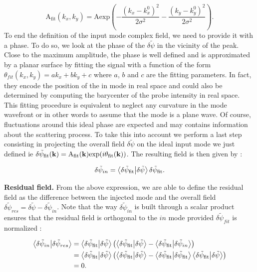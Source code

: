 \begin{equation}
    \mathrm{A_{fit}}(k_x,k_y) = \mathrm{A} \mathrm{exp}(-\frac{(k_x-k_x^0)^2}{2\sigma^2}-\frac{(k_y-k_y^0)^2}{2\sigma^2}).
    \label{eq:gaussian_amp} 
\end{equation}
To end the definition of the input mode complex field, we need to provide it with a phase. To do so, we look at the phase of the $\delta \tilde{\psi}$ 
in the vicinity of the peak. Close to the maximum amplitude, the phase is well defined and is approximated by a planar surface by 
fitting the signal with a function of the form $\theta_{fit}(k_x, k_y)=ak_x+bk_y+c$ where $a$, $b$ and $c$ are the fitting parameters.
In fact, they encode the position of the in mode in real space and could also be determined by computing the barycenter
of the probe intensity in real space. This fitting procedure is equivalent to neglect any curvature 
in the mode wavefront or in other words to assume that the mode is a plane wave. Of course, fluctuations 
around this ideal phase are expected and may contains information about the scattering process. To take this into account we perform a last step 
consisting in projecting the overall field $\delta \tilde{\psi}$ on the ideal input mode we just defined ie $\delta \tilde{\psi}_{\mathrm{fit}}(\mathbf{k})= \mathrm{A_{fit}}(\mathbf{k})\mathrm{exp}(i\theta_{\mathrm{fit}}(\mathbf{k}))$.
The resulting field is then given by : 

\begin{equation}
    \delta \tilde{\psi}_{in} = \bra{\delta \tilde{\psi}_{\mathrm{fit}}}\ket{\delta \tilde{\psi}} \delta \tilde{\psi}_{\mathrm{fit}}. 
    \label{eq:input_mode_scalar_product}
\end{equation}

\bigskip 

\textbf{Residual field.} From the above expression, we are able to define the residual field as the difference between the injected mode and the overall field $\delta \tilde{\psi}_{res} = \delta \tilde{\psi}-\delta \tilde{\psi}_{in}$. 
Note that the way $\delta \tilde{\psi}_{in}$ is built through a scalar product ensures that the residual field is orthogonal to the $in$ mode provided $\delta \tilde{\psi}_{fit}$ is normalized :

\begin{equation}
    \begin{aligned}
    \bra{\delta \tilde{\psi}_{in}}\ket{\delta \tilde{\psi}_{res}} &=\bra{\delta \tilde{\psi}_{\mathrm{fit}}}\ket{\delta \tilde{\psi}} \left(\bra{\delta \tilde{\psi}_{\mathrm{fit}}}\ket{\delta \tilde{\psi}} - \bra{\delta \tilde{\psi}_{\mathrm{fit}}}\ket{\delta \tilde{\psi}_{in}}\right)\\
    &= \bra{\delta \tilde{\psi}_{\mathrm{fit}}}\ket{\delta \tilde{\psi}} \left(\bra{\delta \tilde{\psi}_{\mathrm{fit}}}\ket{\delta \tilde{\psi}}-\bra{\delta \tilde{\psi}_{\mathrm{fit}}}\ket{\delta \tilde{\psi}_{\mathrm{fit}}}\bra{\delta \tilde{\psi}_{\mathrm{fit}}}\ket{\delta \tilde{\psi}}\right)\\
    &=0.
    \end{aligned}
\end{equation}

